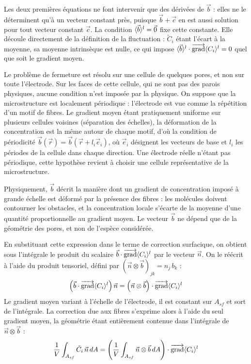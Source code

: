 Les deux premières équations ne font intervenir que des dérivées de
$\vec{b}$ : elles ne le déterminent qu'à un vecteur constant près, puisque
$\vec{b} + \vec{c}$ en est aussi solution pour tout vecteur constant
$\vec{c}$. La condition $\langle \vec{b} \rangle^l = \vec{0}$ fixe cette constante.
Elle découle directement de la définition de la fluctuation : $\tilde{C}_i$
étant l'écart à la moyenne, sa moyenne intrinsèque est nulle, ce qui impose
$\langle \vec{b} \rangle^l\cdot\mathop{\overrightarrow{\operatorname{grad}}}\nolimits\langle C_i \rangle^l = 0$ quel que soit le gradient moyen.

Le problème de fermeture est résolu sur une cellule de quelques pores, et non
sur toute l'électrode. Sur les faces de cette cellule, qui ne sont pas des
parois physiques, aucune condition n'est imposée par la physique. On suppose
que la microstructure est localement périodique : l'électrode est vue comme
la répétition d'un motif de fibres. Le gradient moyen étant pratiquement
uniforme sur plusieurs cellules voisines (séparation des échelles), la
déformation de la concentration est la même autour de chaque motif, d'où la
condition de périodicité
$\vec{b}(\vec{r}) = \vec{b}(\vec{r} + l_i \vec{e}_i)$, où $\vec{e}_i$ désignent
les vecteurs de base et $l_i$ les périodes de la cellule dans chaque
direction. Une électrode réelle n'étant pas périodique, cette hypothèse
revient à choisir une cellule représentative de la microstructure.

Physiquement, $\vec{b}$ décrit la manière dont un gradient de concentration
imposé à grande échelle est déformé par la présence des fibres : les molécules
doivent contourner les obstacles, et la concentration locale s'écarte de la
moyenne d'une quantité proportionnelle au gradient moyen. Le vecteur $\vec{b}$
ne dépend que de la géométrie des pores, et non de l'espèce considérée.

En substituant cette expression dans le terme de correction surfacique,
on obtient sous l'intégrale le produit du scalaire
$\vec{b}\cdot\mathop{\overrightarrow{\operatorname{grad}}}\nolimits\langle C_i \rangle^l$ par le vecteur $\vec{n}$. On le réécrit à
l'aide du produit tensoriel, défini par
$(\vec{n}\otimes\vec{b})_{jk} = n_j\, b_k$ :
\begin{equation}
\left(\vec{b}\cdot\mathop{\overrightarrow{\operatorname{grad}}}\nolimits\langle C_i \rangle^l\right)\vec{n}
= \left(\vec{n}\otimes\vec{b}\right)\cdot\mathop{\overrightarrow{\operatorname{grad}}}\nolimits\langle C_i \rangle^l
\end{equation}
Le gradient moyen variant à l'échelle de l'électrode, il est constant sur
$A_{sf}$ et sort de l'intégrale. La correction due aux fibres s'exprime
alors à l'aide du seul gradient moyen, la géométrie étant entièrement
contenue dans l'intégrale de $\vec{n}\otimes\vec{b}$ :
\begin{equation}
\frac{1}{V}\int_{A_{sf}} \tilde{C}_i\,\vec{n}\, dA
= \left(\frac{1}{V}\int_{A_{sf}} \vec{n}\otimes\vec{b}\, dA\right)\cdot\mathop{\overrightarrow{\operatorname{grad}}}\nolimits\langle C_i \rangle^l
\end{equation}

